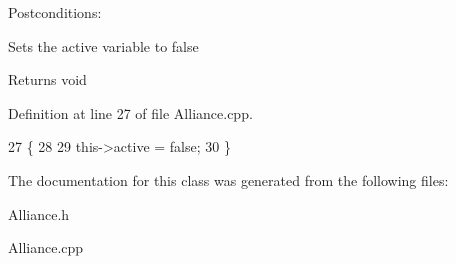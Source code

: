Postconditions\+:
\begin{DoxyItemize}
\item Sets the active variable to false
\end{DoxyItemize}

\begin{DoxyReturn}{Returns}
void 
\end{DoxyReturn}


Definition at line 27 of file Alliance.\+cpp.


\begin{DoxyCode}
27                         \{
28 
29     this->active = \textcolor{keyword}{false};
30 \}
\end{DoxyCode}


The documentation for this class was generated from the following files\+:\begin{DoxyCompactItemize}
\item 
Alliance.\+h\item 
Alliance.\+cpp\end{DoxyCompactItemize}
